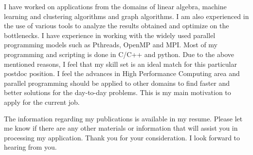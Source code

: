 \documentclass[10pt,stdletter,dateno]{newlfm}
\begin{document}
\begin{newlfm}
       I have worked on applications from the domains of linear algebra, machine learning and clustering algorithms and graph algorithms.
	   I am also experienced in the use of various tools to analyze the results obtained and optimize on the bottlenecks.
	   I have experience in working with the widely used parallel programming models such as Pthreads, OpenMP and MPI.
       Most of my programming and scripting is done in C/C++ and python.
       Due to the above mentioned reasons, I feel that my skill set is an ideal match for this particular postdoc position. 
	   I feel the advances in High Performance Computing area and parallel programming should be applied to other domains to find faster and better solutions for the day-to-day problems. 
	   This is my main motivation to apply for the current job. 
%
	   \par
	   The information regarding my publications is available in my resume.
	   Please let me know if there are any other materials or information that will assist you in processing my application.
	   Thank you for your consideration. I look forward to hearing from you.
%
\end{newlfm}
\end{document}
